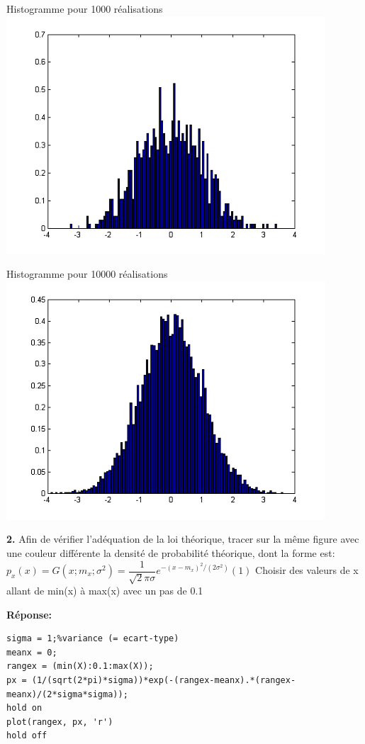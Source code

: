 \documentclass[12pt]{article}
\begin{document}
\begin{flushleft}
Histogramme pour 1000 réalisations
\includegraphics{1_1_1000.PNG}
\end{flushleft}

\begin{flushleft}
Histogramme pour 10000 réalisations
\includegraphics{1_1_10000.PNG}
\end{flushleft}

\textbf{2. }Afin de vérifier l'adéquation de la loi théorique, tracer sur la même figure avec une couleur différente la densité de probabilité théorique, dont la forme est:
\smallbreak
$
p_x(x)=G(x;m_x;\sigma^2)=\dfrac{1}{\sqrt2\pi\sigma} e^{-(x-m_x)^2/(2\sigma^2)}
(1)
$
Choisir des valeurs de x allant de min(x) à max(x) avec un pas de 0.1

\smallbreak
\textbf{Réponse:}
\begin{lstlisting}[style=Matlab-editor]
sigma = 1;%variance (= ecart-type)
meanx = 0;
rangex = (min(X):0.1:max(X));
px = (1/(sqrt(2*pi)*sigma))*exp(-(rangex-meanx).*(rangex-meanx)/(2*sigma*sigma));
hold on
plot(rangex, px, 'r')
hold off
\end{lstlisting}
\end{document}
